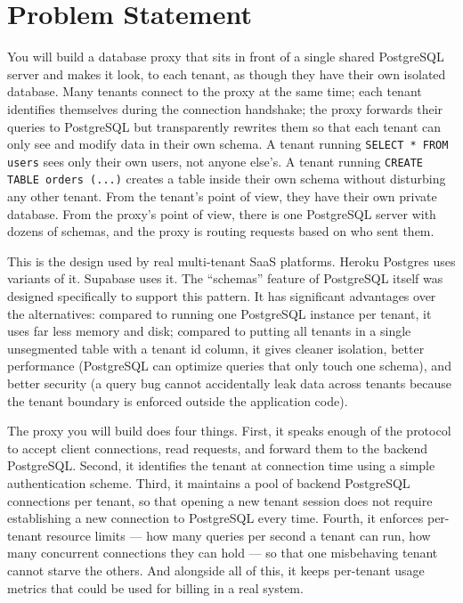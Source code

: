 \documentclass[11pt,a4paper]{article}
\begin{document}

\section{Problem Statement}

You will build a database proxy that sits in front of a single shared PostgreSQL server and makes it look, to each tenant, as though they have their own isolated database. Many tenants connect to the proxy at the same time; each tenant identifies themselves during the connection handshake; the proxy forwards their queries to PostgreSQL but transparently rewrites them so that each tenant can only see and modify data in their own schema. A tenant running \texttt{SELECT * FROM users} sees only their own users, not anyone else's. A tenant running \texttt{CREATE TABLE orders (...)} creates a table inside their own schema without disturbing any other tenant. From the tenant's point of view, they have their own private database. From the proxy's point of view, there is one PostgreSQL server with dozens of schemas, and the proxy is routing requests based on who sent them.

This is the design used by real multi-tenant SaaS platforms. Heroku Postgres uses variants of it. Supabase uses it. The ``schemas'' feature of PostgreSQL itself was designed specifically to support this pattern. It has significant advantages over the alternatives: compared to running one PostgreSQL instance per tenant, it uses far less memory and disk; compared to putting all tenants in a single unsegmented table with a tenant id column, it gives cleaner isolation, better performance (PostgreSQL can optimize queries that only touch one schema), and better security (a query bug cannot accidentally leak data across tenants because the tenant boundary is enforced outside the application code).

The proxy you will build does four things. First, it speaks enough of the protocol to accept client connections, read requests, and forward them to the backend PostgreSQL. Second, it identifies the tenant at connection time using a simple authentication scheme. Third, it maintains a pool of backend PostgreSQL connections per tenant, so that opening a new tenant session does not require establishing a new connection to PostgreSQL every time. Fourth, it enforces per-tenant resource limits --- how many queries per second a tenant can run, how many concurrent connections they can hold --- so that one misbehaving tenant cannot starve the others. And alongside all of this, it keeps per-tenant usage metrics that could be used for billing in a real system.
\end{document}
